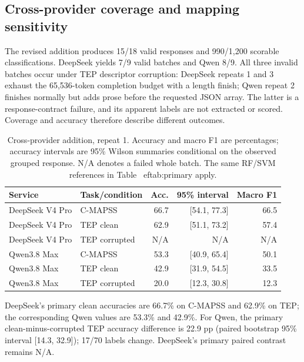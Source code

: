 \documentclass[11pt,a4paper]{article}
\begin{document}
\FloatBarrier
\subsection{Cross-provider coverage and mapping sensitivity}
The revised addition produces 15/18 valid responses and 990/1,200 scorable classifications. DeepSeek yields 7/9 valid batches and Qwen 8/9. All three invalid batches occur under TEP descriptor corruption: DeepSeek repeats 1 and 3 exhaust the 65,536-token completion budget with a length finish; Qwen repeat 2 finishes normally but adds prose before the requested JSON array. The latter is a response-contract failure, and its apparent labels are not extracted or scored. Coverage and accuracy therefore describe different outcomes.

\begin{table}[htbp]
\centering
\small
\caption{Cross-provider addition, repeat 1. Accuracy and macro F1 are percentages; accuracy intervals are 95\% Wilson summaries conditional on the observed grouped response. N/A denotes a failed whole batch. The same RF/SVM references in Table~
ef{tab:primary} apply.}
\label{tab:domestic_primary}
\begin{tabular}{@{}llrrr@{}}
\toprule
Service & Task/condition & Acc. & 95\% interval & Macro F1 \\
\midrule
DeepSeek V4 Pro & C-MAPSS & 66.7 & [54.1, 77.3] & 66.5 \\
DeepSeek V4 Pro & TEP clean & 62.9 & [51.1, 73.2] & 57.4 \\
DeepSeek V4 Pro & TEP corrupted & N/A & N/A & N/A \\
Qwen3.8 Max & C-MAPSS & 53.3 & [40.9, 65.4] & 50.1 \\
Qwen3.8 Max & TEP clean & 42.9 & [31.9, 54.5] & 33.5 \\
Qwen3.8 Max & TEP corrupted & 20.0 & [12.3, 30.8] & 12.3 \\
\bottomrule
\end{tabular}
\end{table}

DeepSeek's primary clean accuracies are 66.7\% on C-MAPSS and 62.9\% on TEP; the corresponding Qwen values are 53.3\% and 42.9\%. For Qwen, the primary clean-minus-corrupted TEP accuracy difference is 22.9 pp (paired bootstrap 95\% interval [14.3, 32.9]); 17/70 labels change. DeepSeek's primary paired contrast remains N/A.
\end{document}
